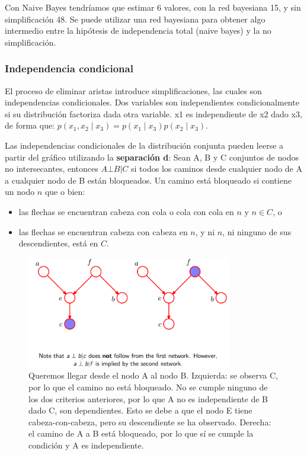Con Naive Bayes tendríamos que estimar 6 valores, con la red bayesiana 15, y sin simplificación 48. Se puede utilizar una red bayesiana para obtener algo intermedio entre la hipótesis de independencia total (naive bayes) y la no simplificación.

\subsubsection{Independencia condicional}
El proceso de eliminar aristas introduce simplificaciones, las cuales son independencias condicionales. Dos variables son independientes condicionalmente si su distribución factoriza dada otra variable.
x1 es independiente de x2 dado x3, de forma que: $p(x_1, x_2 \mid x_3) = p(x_1\mid x_3) p(x_2 \mid x_3)$.

Las independencias condicionales de la distribución conjunta pueden leerse a partir del gráfico utilizando la \textbf{separación d}: Sean A, B y C conjuntos de nodos no intersecantes, entonces $A \bot B|C$ si todos los caminos desde cualquier nodo de A a cualquier nodo de B están bloqueados.
Un camino está bloqueado si contiene un nodo $n$ que o bien:
\begin{itemize}
\item las flechas se encuentran cabeza con cola o cola con cola en $n$ y $n \in C$, o
\item las flechas se encuentran cabeza con cabeza en $n$, y ni $n$, ni ninguno de sus descendientes, está en $C$.
\end{itemize}

\begin{figure}[h]
\centering
\includegraphics[width = 0.8\textwidth]{figs/conditional-independence.png}
\caption{Queremos llegar desde el nodo A al nodo B. Izquierda: se observa C, por lo que el camino no está bloqueado. No se cumple ninguno de los dos criterios anteriores, por lo que A no es independiente de B dado C, son dependientes. Esto se debe a que el nodo E tiene cabeza-con-cabeza, pero su descendiente se ha observado. Derecha: el camino de A a B está bloqueado, por lo que sí se cumple la condición y A es independiente.}
\end{figure}

